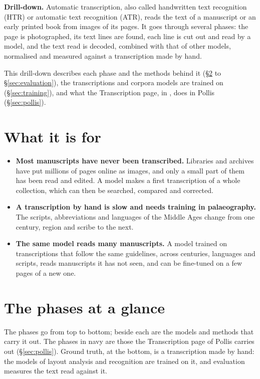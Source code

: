 \begin{nbox}
{\color{amber}\bfseries Drill-down.}\enspace
Automatic transcription, also called handwritten text recognition (HTR) or automatic text recognition (ATR), reads
the text of a manuscript or an early printed book from images of its pages. It goes through several phases: the page
is photographed, its text lines are found, each line is cut out and read by a model, and the text read is decoded,
combined with that of other models, normalised and measured against a transcription made by hand.

This drill-down describes each phase and the methods behind it (\S\ref{sec:glance} to \S\ref{sec:evaluation}), the
transcriptions and corpora models are trained on (\S\ref{sec:training}), and what the Transcription page, in
\gt{}, does in Pollis (\S\ref{sec:pollis}).
\end{nbox}

{\setlength{\parskip}{0pt}\tableofcontents}

\section{What it is for}\label{sec:why}
\begin{itemize}
  \item \textbf{Most manuscripts have never been transcribed.} Libraries and archives have put millions of pages
    online as images, and only a small part of them has been read and edited. A model makes a first transcription
    of a whole collection, which can then be searched, compared and corrected.
  \item \textbf{A transcription by hand is slow and needs training in palaeography.} The scripts, abbreviations and
    languages of the Middle Ages change from one century, region and scribe to the next.
  \item \textbf{The same model reads many manuscripts.} A model trained on transcriptions that follow the same
    guidelines, across centuries, languages and scripts, reads manuscripts it has not seen, and can be fine-tuned
    on a few pages of a new one.
\end{itemize}

\section{The phases at a glance}\label{sec:glance}
The phases go from top to bottom; beside each are the models and methods that carry it out. The phases in navy are
those the Transcription page of Pollis carries out (\S\ref{sec:pollis}). Ground truth, at the bottom, is a
transcription made by hand: the models of layout analysis and recognition are trained on it, and evaluation measures
the text read against it.

